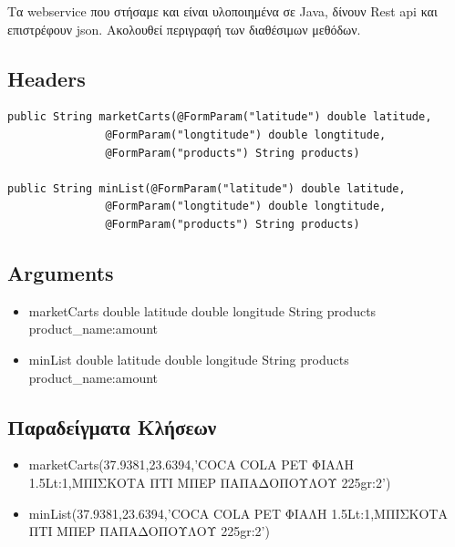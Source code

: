 \documentclass[a4paper,10pt]{report}
\begin{document}
Τα webservice που στήσαμε και είναι υλοποιημένα σε Java, δίνουν Rest api και επιστρέφουν json.
Ακολουθεί περιγραφή των διαθέσιμων μεθόδων.
\subsection{Headers}
\begin{verbatim}
public String marketCarts(@FormParam("latitude") double latitude,
			   @FormParam("longtitude") double longtitude,
			   @FormParam("products") String products)
			   
public String minList(@FormParam("latitude") double latitude,
			   @FormParam("longtitude") double longtitude,
			   @FormParam("products") String products)
\end{verbatim}

\subsection{Arguments}
\begin{itemize}
 \item marketCarts
 \subitem double latitude
 \subitem double longitude
 \subitem String products
 \subsubitem product\_name:amount
 \item minList
 \subitem double latitude
 \subitem double longitude
 \subitem String products
 \subsubitem product\_name:amount
\end{itemize}
\subsection{Παραδείγματα Κλήσεων}
\begin{itemize}
 \item marketCarts(37.9381,23.6394,'COCA COLA  PET ΦΙΑΛΗ 1.5Lt:1,ΜΠΙΣΚΟΤΑ ΠΤΙ ΜΠΕΡ ΠΑΠΑΔΟΠΟΥΛΟΥ 225gr:2')
 \item minList(37.9381,23.6394,'COCA COLA  PET ΦΙΑΛΗ 1.5Lt:1,ΜΠΙΣΚΟΤΑ ΠΤΙ ΜΠΕΡ ΠΑΠΑΔΟΠΟΥΛΟΥ 225gr:2')
\end{itemize}
\end{document}
